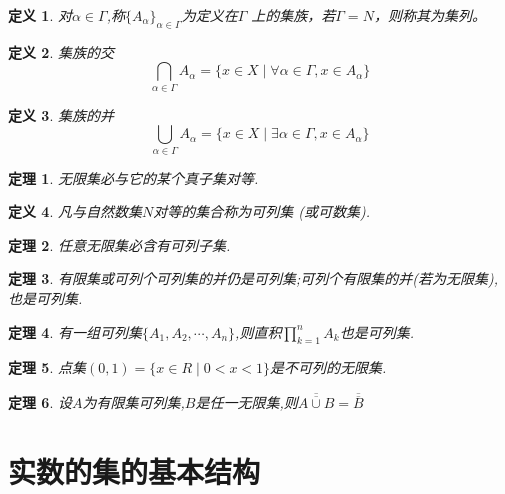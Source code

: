 \documentclass[UTF8]{ctexbook}
\newtheorem{definition}{定义}[chapter]
\newtheorem{thm}{定理}[chapter]
\newcommand{\jhshi}[1]{\overline{\overline{#1}}}
\begin{document}
\begin{definition}
    对$\alpha \in \Gamma$,称$\{ A_{\alpha} \}_{\alpha \in \Gamma}$为定义在$\Gamma$
    上的集族，若$\Gamma = N$，则称其为集列。
\end{definition}

\begin{definition}
    集族的交
    \begin{equation}
    \bigcap_{\alpha \in \Gamma} A_{\alpha} 
    = \{ x \in X \mid \forall \alpha \in \Gamma ,
        x \in A_{\alpha} \}
    \end{equation}
\end{definition}

\begin{definition}
    集族的并
    \begin{equation}
    \bigcup_{\alpha \in \Gamma} A_{\alpha} 
    = \{ x \in X \mid \exists \alpha \in \Gamma ,
    x \in A_{\alpha} \}
    \end{equation}
\end{definition}

\begin{thm}
    无限集必与它的某个真子集对等.
\end{thm}

\begin{definition}
    凡与自然数集$N$对等的集合称为可列集 (或可数集).
\end{definition}

\begin{thm}
    任意无限集必含有可列子集.
\end{thm}

\begin{thm}
    有限集或可列个可列集的并仍是可列集;可列个有限集的并(若为无限集),也是可列集.
\end{thm}

\begin{thm}
    有一组可列集$\{ A_1, A_2, \cdots, A_n \}$,则直积$ \prod_{k=1}^n A_k $也是可列集.
\end{thm}

\begin{thm}
    点集$ ( 0, 1)  = \{ x \in R \mid 0 <  x <  1 \} $是不可列的无限集.
\end{thm}

\begin{thm}
    设$A$为有限集可列集,$B$是任一无限集,则$\jhshi{A \cup B} = \jhshi B$
\end{thm}

\section{实数的集的基本结构}
\end{document}
